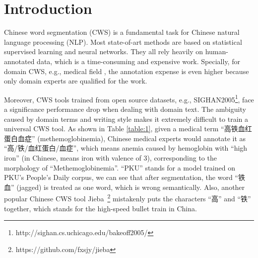 \section{Introduction} \label{sec:intro}



Chinese word segmentation (CWS) is a fundamental task for Chinese natural language processing (NLP). Most state-of-art methods are based on statistical supervised learning and neural networks. They all rely heavily on human-annotated data, which is a time-consuming and expensive work. Specially, for domain CWS, e.g., medical field , the annotation expense is even higher because only 
domain experts are qualified for the work. 

Moreover, CWS tools trained from open source datasets, 
e.g., SIGHAN2005\footnote{http://sighan.cs.uchicago.edu/bakeoff2005/}, 
face a significance performance drop when dealing with domain text. 
The ambiguity caused by domain terms and writing style makes it extremely 
difficult to train a universal CWS tool. As shown in Table \ref{table:1}, 
given a medical term “高铁血红蛋白血症” (methemoglobinemia), 
Chinese medical experts would annotate it as “高/铁/血红蛋白/血症”, 
which means anemia caused by hemoglobin with ``high iron'' (in Chinese, 
means iron with valence of 3), corresponding to the morphology of 
``Methemoglobinemia''. ``PKU'' stands for a model trained on PKU's 
People's Daily corpus, we can see that after segmentation, the word 
``铁血'' (jagged) is treated as one word, which is wrong semantically. 
Also, another popular Chinese CWS tool 
Jieba~\footnote{https://github.com/fxsjy/jieba}
mistakenly puts the characters ``高'' and ``铁'' together, which stands for the high-speed bullet train in China.

